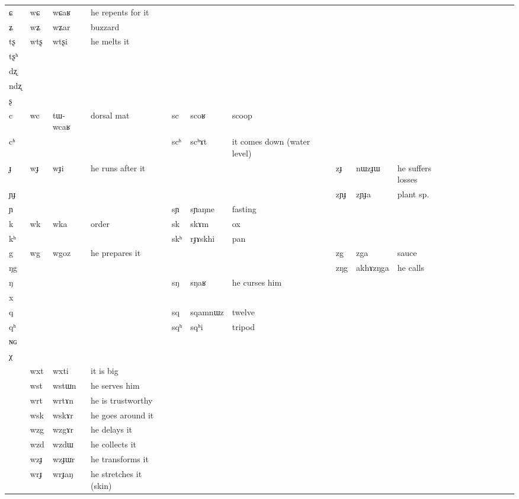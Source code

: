 \documentclass[oldfontcommands,oneside,a4paper,11pt]{article}
\newcommand{\ipa}[1]{{\phon #1}} %
\newcommand{\tib}[1]{\cellcolor{lightgray}\textbf{#1}}
\begin{document}
\begin{table}
{\begin{tabular}{l|lll|lll|lll|lllllll}
\ipa{ɕ}  &	\ipa{wɕ}  &	\ipa{wɕaʁ}  &he repents for it&	  &	  &	&	  &	  &	&	\\
\ipa{ʑ}  &	\ipa{wʑ}  &	\ipa{wʑar }  &	buzzard&	  &	  &	&	  &	  &	&	\\
\ipa{tʂ}  &	\ipa{wtʂ}  &	\ipa{wtʂi}  & he melts it	&	  &	  &	&	  &	  &	&	\\
\ipa{tʂʰ}  &	  &	  &	&	  &	  &	&	  &	  &	&	\\
\ipa{dʐ}  &	  &	  &	&	  &	  &	&	  &	  &	&	\\
\ipa{ndʐ}  &	  &	  &	&	  &	  &	&	  &	  &	&	\\
\ipa{ʂ}  &	  &	  &	&	  &	  &	&	  &	  &	&	\\
\ipa{c}  &	\ipa{wc}  &	\ipa{tɯ-wcaʁ }  &dorsal mat	&	\ipa{sc}  &	\ipa{scoʁ}  &scoop	&	  &	  &	&	\\
\ipa{cʰ}  &	  &	  &	&	\ipa{scʰ}  &	\ipa{scʰɤt}  &	it comes down (water level)&	  &	  &	&	\\
\ipa{ɟ}  &	\ipa{wɟ}  &	\ipa{wɟi}  &he runs after it	&	  &	  &	&	\ipa{zɟ}  &	\ipa{nɯzɟɯ}  &	he suffers losses&	\\
\ipa{ɲɟ}  &	  &	  &	&	  &	  &	&	\ipa{zɲɟ}  &	\ipa{zɲɟa}  &	plant sp.&	\\
\ipa{ɲ}  &	  &	  &	&	\ipa{sɲ}  &	\ipa{sɲaŋne}  &fasting	&	   &	 &	&	\\
\ipa{k}  &	\ipa{wk}  &	\ipa{wka}  &	order&	\ipa{sk}  &	\ipa{skɤm}  &	ox&	  &	  &	&	\\
\ipa{kʰ}  &	  &	  &	&	\ipa{skʰ}  &	\ipa{rɟɤskhi}  &pan	&	  &	  &	&	\\
\ipa{g}  &	\ipa{wg}  \tib{}&	\ipa{wgoz}  &	he prepares it&	  &	  &	& 	\ipa{zg}  &	\ipa{zga}  &	sauce&	\\
\ipa{ŋg}  &	  &	  &	&	  &	  &	&	\ipa{zŋg}  &	\ipa{akhɤzŋga}  &	he calls&	\\
\ipa{ŋ}  &	  &	  &	&	\ipa{sŋ}  &	\ipa{sŋaʁ}  &	he curses him&	  &	  &	&	\\
\ipa{x}  &	  &	  &	&	  &	  &	&	  &	  &	&	\\
\ipa{q}  &	  &	  &	&	\ipa{sq}  &	\ipa{sqamnɯz}  &	twelve&	  &	  &	&	\\
\ipa{qʰ}  &	  &	  &	&	\ipa{sqʰ}  &	\ipa{sqʰi}  &	tripod&	  &	  &	&	\\
\ipa{ɴɢ}  &	  &	  &	&	  &	  &	&	  &	  &	&	\\
\ipa{χ}  &	  &	  &	&	  &	  &	&	  &	  &	&	\\
\midrule
&	\ipa{wxt}  &	\ipa{wxti}  &it is big	\\
&	\ipa{wst} \tib{} &	\ipa{wstɯn}  &he serves him	\\
&	\ipa{wrt}  \tib{} &	\ipa{wrtɤn}  &	he is trustworthy\\
&	\ipa{wsk}  \tib{} &	\ipa{wskɤr}  & he goes around it	\\
&	\ipa{wzg}  \tib{} &	\ipa{wzgɤr}  & he delays it	\\
&	\ipa{wzd}  \tib{} &	\ipa{wzdɯ}  & he collects it	\\
&	\ipa{wzɟ}  \tib{} &	\ipa{wzɟɯr}  & he transforms it	\\
&	\ipa{wrɟ}  \tib{} &	\ipa{wrɟaŋ}  &he stretches it (skin)	\\
\bottomrule
\end{tabular}} 
\end{table}
 
\end{document}
